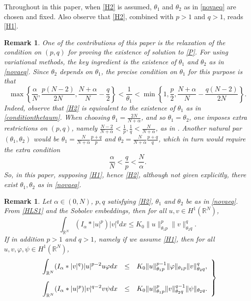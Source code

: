 \documentclass[12pt,a4paper]{article}
\newtheorem{remark}[theorem]{Remark}
\numberwithin{equation}{section}
\begin{document}
Throughout in this paper, when \eqref{H2} is assumed, $\theta_1$ and $\theta_2$ as in \eqref{novaeq} are chosen and fixed. Also observe that \eqref{H2}, combined with $p>1$ and $q>1$, reads \eqref{H1}.

\begin{remark}\label{thetas}
One of the contributions of this paper is the relaxation of the condition on $(p,q)$ for proving the existence of solution to \eqref{P}. For using variational methods, the key ingredient is the existence of $\theta_1$ and $\theta_2$ as in \eqref{novaeq}. Since $\theta_2$ depends on $\theta_1$, the precise condition on $\theta_1$ for this purpose is that
\begin{equation}\label{conditionthetaum}
\max\left\{ \dfrac{\alpha}{N}, \dfrac{p(N-2)}{2N}, \dfrac{N+\alpha}{N} - \dfrac{q}{2} \right\} < \dfrac{1}{\theta_1} < \min\left\{ 1, \dfrac{p}{2}, \dfrac{N + \alpha}{N} - \dfrac{q(N-2)}{2N} \right\}.
\end{equation}
Indeed, observe that \eqref{H2} is equivalent to the existence of $\theta_1$ as in \eqref{conditionthetaum}. When choosing $\theta_1 = \frac{2N}{N+\alpha}$, and so $\theta_1 = \theta_2$, one imposes extra restrictions on $(p,q)$, namely $\frac{N-2}{N+\alpha}< \frac{1}{p}, \frac{1}{q}< \frac{N}{N+\alpha}$, as in \cite{Chen2023a}. Another natural par $(\theta_1, \theta_2)$ would be $\theta_1 = \frac{N}{N+\alpha} \frac{p+q}{p}$ and $\theta_2 = \frac{N}{N+\alpha} \frac{p+q}{q}$, which in turn would require the extra condition
\[
\dfrac{\alpha}{N} < \dfrac{q}{p} < \dfrac{N}{\alpha}.
\]
So, in this paper, supposing \eqref{H1}, hence \eqref{H2}, although not given explicitly, there exist $\theta_1, \theta_2$ as in \eqref{novaeq}.
\end{remark}

\begin{remark}\label{obs1}
Let $\alpha \in (0,N)$, $p,q$ satisfying \eqref{H2}, $\theta_1$ and $\theta_2$ be as in \eqref{novaeq}. From \eqref{HLS1} and the Sobolev embeddings, then for all $u, v\in H^{1}(\mathbb{R}^N)$,
\begin{equation}\label{eq5}
\int_{\mathbb{R}^N} (I_\alpha \ast |u|^p)|v|^q dx \leq K_0 \|u\|_{\theta_1 p}^{p}\|v\|_{\theta_2 q}^{q}.
\end{equation}
If in addition $p>1$ and $q>1$, namely if we assume \eqref{H1}, then for all $u,v,\varphi, \psi \in H^{1}(\mathbb{R}^N)$,
\begin{equation}\label{eq6}
\left.
\begin{array}{rcl}
\displaystyle\int_{\mathbb{R}^N} (I_\alpha \ast |v|^q)|u|^{p-2} u \varphi dx &\leq& \displaystyle K_0 \|u\|_{\theta_1 p}^{p-1}\|\varphi\|_{\theta_1p}\|v\|_{\theta_2 q}^{q},\vspace{10pt}\\
\displaystyle\int_{\mathbb{R}^N} (I_\alpha \ast |u|^p)|v|^{q-2} v \psi dx &\leq&\displaystyle K_0 \|u\|_{\theta_1 p}^{p}\|v\|_{\theta_2 q}^{q-1}\|\psi\|_{\theta_2 q}.
\end{array}
\right\}
\end{equation}
\end{remark}
\end{document}
